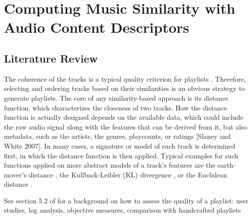 \chapter{Computing Music Similarity with Audio Content Descriptors} 

\label{Chapter3} 


\section{Literature Review}

The coherence of the tracks is a typical quality criterion for playlists \cite{logan04}. 
Therefore, selecting and ordering tracks based on their similarities is an obvious strategy to generate playlists. The core of any similarity-based approach is its distance function, which characterizes the closeness of two tracks. How the distance function is actually designed depends on the available data, which could include the raw audio signal along with the features that can be derived from it, but also metadata, such as the artists, the genres, playcounts, or ratings [Slaney and White 2007]. In many cases, a signature or model of each track is determined first, in which the distance function is then applied. Typical examples for such functions applied on more abstract models of a track’s features are the earth-mover’s distance \cite{logan04}, the Kullback-Leibler (KL) divergence \cite{vignoli05}, or the Euclidean distance \cite{knees06}.

See section 5.2 of \cite{bonnin14} for a background on how to assess the quality of a playlist: user studies, log analysis, objective measures, comparison with handcrafted playlists


